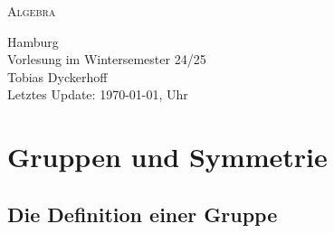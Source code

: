 \documentclass{book}
\begin{document}
\makeatletter\@openrightfalse
\vspace*{\fill}
\begin{center}
{\huge{\textsc{Algebra}}}\\
\vspace{2cm}

\thispagestyle{empty}
\setlength{\parindent}{0pt}
\setlength{\parskip}{\baselineskip}

\textsc{}

\begin{minipage}{\textwidth}
\begin{center}
    Hamburg\\
    Vorlesung im Wintersemester 24/25\\
    Tobias Dyckerhoff\\[2em]
    Letztes Update: \today, \currenttime Uhr
\end{center} 
\end{minipage}

\end{center}
\vfill

\newpage 

\setcounter{tocdepth}{1}

\tableofcontents


\@openrighttrue\makeatother


\makeatletter\@openrightfalse





\chapter{Gruppen und Symmetrie}

\section{Die Definition einer Gruppe}
\end{document}
